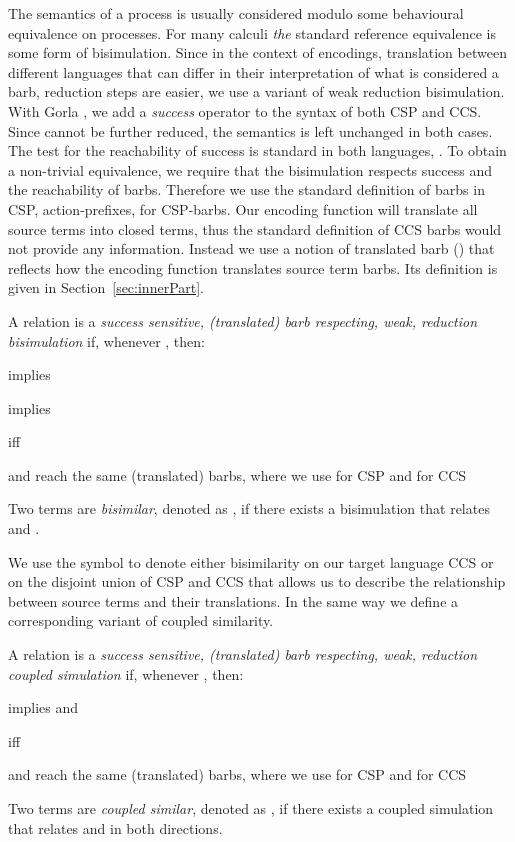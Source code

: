 \documentclass[]{eptcs}
\begin{document}
The semantics of a process is usually considered modulo some behavioural equivalence on processes.
For many calculi \emph{the} standard reference equivalence is some form of bisimulation.
Since in the context of encodings, \ie translation between different languages that can differ in their interpretation of what is considered a barb, reduction steps are easier, we use a variant of weak reduction bisimulation.
With Gorla \cite{gorla10}, we add a \emph{success} operator  to the syntax of both CSP and CCS. Since  cannot be further reduced, the semantics is left unchanged in both cases. The test for the reachability of success is standard in both languages, \ie .
To obtain a non-trivial equivalence, we require that the bisimulation respects success and the reachability of barbs.
Therefore we use the standard definition of barbs in CSP, \ie action-prefixes, for CSP-barbs.
Our encoding function will translate all source terms into closed terms, thus the standard definition of CCS barbs would not provide any information.
Instead we use a notion of translated barb () that reflects how the encoding function translates source term barbs. Its definition is given in Section~\ref{sec:innerPart}.

\begin{definition}[Bisimulation]
	A relation  is a \emph{success sensitive, (translated) barb respecting, weak, reduction bisimulation} if, whenever , then:
	\begin{compactitem}
		\item  implies 
		\item  implies 
		\item  iff 
		\item  and  reach the same (translated) barbs, where we use  for CSP and  for CCS
	\end{compactitem}
	Two terms  are \emph{bisimilar}, denoted as , if there exists a bisimulation that relates  and .
\end{definition}

\noindent
We use the symbol  to denote either bisimilarity on our target language CCS or on the disjoint union of CSP and CCS that allows us to describe the relationship between source terms and their translations. In the same way we define a corresponding variant of coupled similarity.

\begin{definition}
	A relation  is a \emph{success sensitive, (translated) barb respecting, weak, reduction coupled simulation} if, whenever , then:
	\begin{compactitem}
		\item  implies  and 
		\item  iff 
		\item  and  reach the same (translated) barbs, where we use  for CSP and  for CCS
	\end{compactitem}
	Two terms  are \emph{coupled similar}, denoted as , if there exists a coupled simulation that relates  and  in both directions.
\end{definition}
\end{document}
